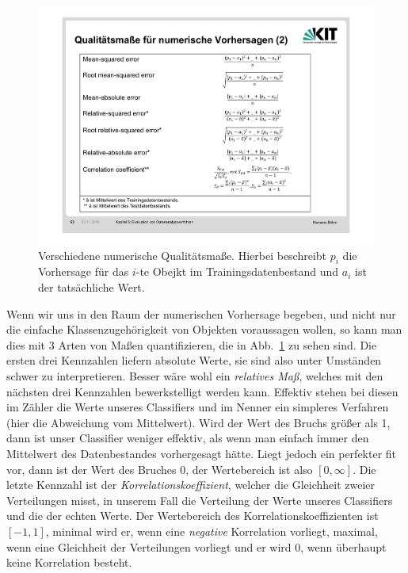 \begin{figure}[ht]
	\centering
	\includegraphics[width=\textwidth]{Figures/numeric_measures}
	\caption[Numeric Measures]{Verschiedene numerische Qualitätsmaße. Hierbei beschreibt
	\(p_i\) die Vorhersage für das \(i\)-te Obejkt im Trainingsdatenbestand
	und \(a_i\) ist der tatsächliche Wert.\footnotemark}
	\label{fig:numeric}
\end{figure}

Wenn wir uns in den Raum der numerischen Vorhersage begeben, und nicht nur die 
einfache Klassenzugehörigkeit von Objekten voraussagen wollen, so kann man 
dies mit 3 Arten von Maßen quantifizieren, die in Abb.~\ref{fig:numeric} zu
sehen sind. Die ersten drei Kennzahlen liefern absolute Werte, sie sind also unter
Umständen schwer zu interpretieren. Besser wäre wohl ein \textit{relatives Maß}, welches mit
den nächsten drei Kennzahlen bewerkstelligt werden kann. Effektiv stehen bei diesen 
im Zähler die Werte unseres Classifiers und im Nenner ein simpleres Verfahren (hier
die Abweichung vom Mittelwert). Wird der Wert des Bruchs größer als 1, dann 
ist unser Classifier weniger effektiv, als wenn man einfach immer den Mittelwert
des Datenbestandes vorhergesagt hätte. Liegt jedoch ein perfekter fit vor, dann
ist der Wert des Bruches 0, der Wertebereich ist also \([0,\infty]\). Die letzte 
Kennzahl ist der \textit{Korrelationskoeffizient}, welcher die Gleichheit zweier
Verteilungen misst, in unserem Fall die Verteilung der Werte unseres Classifiers
und die der echten Werte. Der Wertebereich des Korrelationskoeffizienten ist
\([-1,1]\), minimal wird er, wenn eine \textit{negative} Korrelation vorliegt,
maximal, wenn eine Gleichheit der Verteilungen vorliegt und er wird 0, wenn überhaupt
keine Korrelation besteht.

